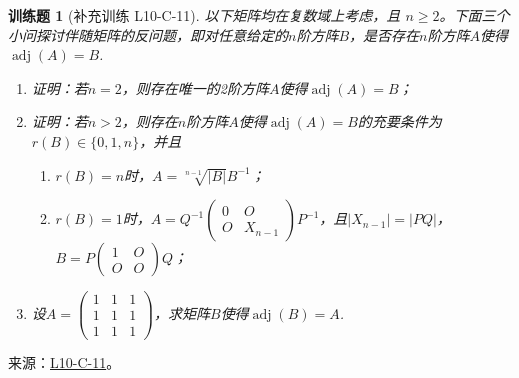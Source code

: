 \documentclass[12pt,fontset=fandol]{ctexart}
\newtheorem{exercise}{训练题}[section]
\begin{document}
\begin{exercise}[补充训练 L10-C-11]\label{prob:L10-C-11}
以下矩阵均在复数域上考虑，且 $n\ge2$。下面三个小问探讨伴随矩阵的反问题，即对任意给定的$n$阶方阵$B$，是否存在$n$阶方阵$A$使得$\operatorname{adj}(A)=B$.
        \begin{enumerate}
            \item 证明：若$n=2$，则存在唯一的2阶方阵$A$使得$\operatorname{adj}(A)=B$；

            \item 证明：若$n > 2$，则存在$n$阶方阵$A$使得$\operatorname{adj}(A)=B$的充要条件为$r(B) \in \{0,1,n\}$，并且
                  \begin{enumerate}
                      \item $r(B)=n$时，$A=\sqrt[n-1]{|B|}B^{-1}$；

                      \item $r(B)=1$时，$A=Q^{-1}\begin{pmatrix}
                                    0 & O \\ O & X_{n-1}
                                \end{pmatrix}P^{-1}$，且$|X_{n-1}|=|PQ|$，$B=P\begin{pmatrix}
                                    1 & O \\ O & O
                                \end{pmatrix}Q$；
                  \end{enumerate}

            \item 设$A=\begin{pmatrix}
                          1 & 1 & 1 \\ 1 & 1 & 1 \\ 1 & 1 & 1
                      \end{pmatrix}$，求矩阵$B$使得$\operatorname{adj}(B)=A$.
        \end{enumerate}
\end{exercise}
\noindent 来源：\href{https://github.com/yhwu-is/Linear-Algebra-Left-Undone/blob/new/%E8%AE%B2%E4%B9%89/%E4%B8%93%E9%A2%98/10%20%E8%A1%8C%E5%88%97%E5%BC%8F.tex}{L10-C-11}。
\end{document}
